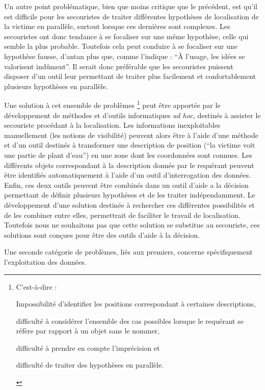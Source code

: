 Un autre point problématique, bien que moins critique que le
précédent, est qu'il est difficile pour les secouristes de traiter
différentes hypothèses de localisation de la victime en parallèle,
surtout lorsque ces dernières sont complexes. Les secouristes ont donc
tendance à se focaliser sur une même hypothèse, celle qui semble la
plus probable. Toutefois cela peut conduire à se focaliser sur une
hypothèse fausse, d’antan plus que, comme l'indique
\textcite{Bachelard1934} : \enquote{À l'usage, les idées se valorisent
  indûment}. Il serait donc préférable que les secouristes puissent
disposer d'un outil leur permettant de traiter plus facilement et
confortablement plusieurs hypothèses en parallèle.

Une solution à cet ensemble de problèmes \footnote{C'est-à-dire :%
  \begin{enumerate*}[label=(\arabic*)]
  \item Impossibilité d'identifier les positions correspondant à
    certaines descriptions,
  \item difficulté à considérer l'ensemble des cas possibles lorsque
    le requérant se réfère par rapport à un objet sans le nommer,
  \item difficulté à prendre en compte l'imprécision et
  \item difficulté de traiter des hypothèses en parallèle.
  \end{enumerate*}} peut être apportée par le développement de
méthodes et d'outils informatiques \emph{ad hoc,} destinés à assister
le secouriste procédant à la localisation. Les informations
inexploitables manuellement (\eg les notions de visibilité) peuvent
alors être à l'aide d'une méthode et d'un outil destinés à transformer
une description de position (\eg \enquote{la victime voit une partie
  de plant d'eau}) en une zone dont les coordonnées sont connues. Les
différents objets correspondant à la description donnée par le
requérant peuvent être identifiés automatiquement à l'aide d'un outil
d’interrogation des données. Enfin, ces deux outils peuvent être
combinés dans un outil d'aide a la décision permettant de définir
plusieurs hypothèses et de les traiter indépendamment. Le
développement d'une solution destinée à rechercher ces différentes
possibilités et de les combiner entre elles, permettrait de faciliter
le travail de localisation.
%
Toutefois nous ne souhaitons pas que cette
solution se substitue au secouriste, ces solutions sont conçues pour
être des outils d'aide à la décision.

Une seconde catégorie de problèmes, liés aux premiers, concerne
spécifiquement l'exploitation des données.

